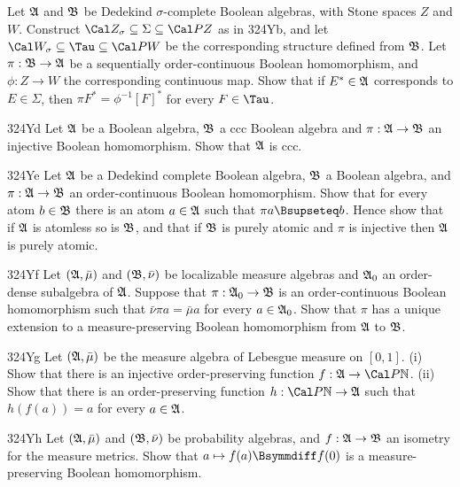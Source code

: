 { Let $\frak A$ and $\frak B$ be Dedekind
$\sigma$-complete Boolean algebras, with Stone spaces $Z$ and $W$.
Construct $\Cal Z_{\sigma}\subseteq\Sigma\subseteq\Cal PZ$ as in 324Yb,
and let $\Cal W_{\sigma}\subseteq\Tau\subseteq\Cal PW$ be the
corresponding structure defined from $\frak B$.   Let
$\pi:\frak B\to\frak A$ be a sequentially order-continuous 
Boolean homomorphism, and $\phi:Z\to W$ the corresponding continuous map.
Show that if $E^*\in\frak A$ corresponds to $E\in\Sigma$, then
$\pi F^*=\phi^{-1}[F]^*$ for every $F\in\Tau$.   
     
\spheader 324Yd Let $\frak A$ be a Boolean algebra, $\frak B$ a ccc
Boolean algebra and $\pi:\frak A\to\frak B$ an injective Boolean
homomorphism.   Show that $\frak A$ is ccc.
     
\spheader 324Ye Let $\frak A$ be a Dedekind complete Boolean
algebra, $\frak B$ a Boolean algebra, and $\pi:\frak A\to\frak B$ an
order-continuous Boolean homomorphism.   Show that for every atom
$b\in\frak B$ there is an atom $a\in\frak A$ such that 
$\pi a\Bsupseteq b$.   
Hence show that if $\frak A$ is atomless so is $\frak B$, and that
if $\frak B$ is purely atomic and $\pi$ is injective then $\frak A$ is
purely atomic.
     
\spheader 324Yf Let $(\frak A,\bar\mu)$ and $(\frak B,\bar\nu)$ be
localizable measure algebras and $\frak A_0$ an order-dense subalgebra
of $\frak A$.
Suppose that $\pi:\frak A_0\to\frak B$ is an order-continuous Boolean
homomorphism such that $\bar\nu\pi a=\bar\mu a$ for every
$a\in\frak A_0$.  Show that $\pi$ has a unique extension to a
measure-preserving Boolean homomorphism from $\frak A$ to $\frak B$.
     
\spheader 324Yg
Let $(\frak A,\bar\mu)$ be the measure algebra of
Lebesgue measure on $[0,1]$.  (i) Show that there is an injective
order-preserving function $f:\frak A\to\Cal P\Bbb N$.      (ii) Show that there is an
order-preserving function $h:\Cal P\Bbb N\to\frak A$ such that
$h(f(a))=a$ for every $a\in\frak A$.      
     
\spheader 324Yh 
Let $(\frak A,\bar\mu)$ and $(\frak B,\bar\nu)$ be 
probability algebras, and $f:\frak A\to\frak B$ an isometry for the 
measure metrics.   Show that $a\mapsto f(a)\Bsymmdiff f(0)$ is a 
measure-preserving Boolean homomorphism.
     
}%
     
